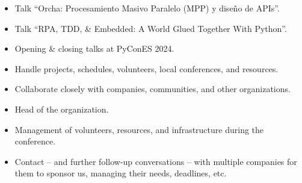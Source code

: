 \documentclass[10pt,a4paper,ragged2e]{altacv}
\begin{document}
\begin{itemize}
  \item Talk ``Orcha: Procesamiento Masivo Paralelo (MPP) y diseño de APIs''.
  \item Talk ``RPA, TDD, \& Embedded: A World Glued Together With Python''.
  \item Opening \& closing talks at PyConES 2024.
\end{itemize}

\divider


\begin{itemize}
  \item Handle projects, schedules, volunteers, local conferences, and resources.
  \item Collaborate closely with companies, communities, and other organizations.
\end{itemize}

\divider


\begin{itemize}
  \item Head of the organization.
  \item Management of volunteers, resources, and infrastructure during the conference.
  \item Contact -- and further follow-up conversations -- with multiple companies for them to sponsor us, managing their needs, deadlines, etc.
\end{itemize}







\end{document}
